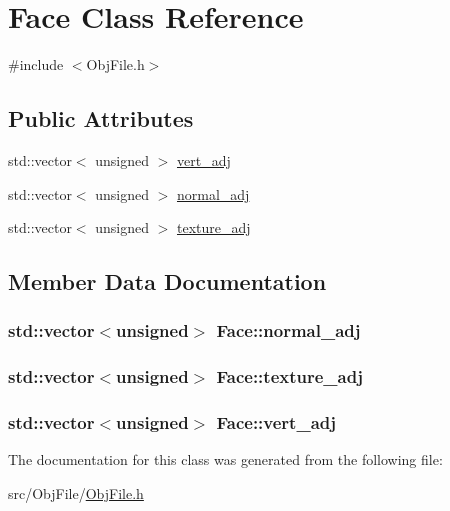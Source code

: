 \hypertarget{class_face}{}\section{Face Class Reference}
\label{class_face}


{\ttfamily \#include $<$Obj\+File.\+h$>$}

\subsection*{Public Attributes}
\begin{DoxyCompactItemize}
\item 
std\+::vector$<$ unsigned $>$ \hyperlink{class_face_ae9bd89e13d4b490419bbf1064c323160}{vert\+\_\+adj}
\item 
std\+::vector$<$ unsigned $>$ \hyperlink{class_face_a7f5e83f895d215cfd1a556fe3fcaf936}{normal\+\_\+adj}
\item 
std\+::vector$<$ unsigned $>$ \hyperlink{class_face_ad81fb1b3e97a9385aeb6e2dd360c60a7}{texture\+\_\+adj}
\end{DoxyCompactItemize}


\subsection{Member Data Documentation}
\subsubsection[{\texorpdfstring{normal\+\_\+adj}{normal_adj}}]{\setlength{\rightskip}{0pt plus 5cm}std\+::vector$<$unsigned$>$ Face\+::normal\+\_\+adj}\hypertarget{class_face_a7f5e83f895d215cfd1a556fe3fcaf936}{}\label{class_face_a7f5e83f895d215cfd1a556fe3fcaf936}
\subsubsection[{\texorpdfstring{texture\+\_\+adj}{texture_adj}}]{\setlength{\rightskip}{0pt plus 5cm}std\+::vector$<$unsigned$>$ Face\+::texture\+\_\+adj}\hypertarget{class_face_ad81fb1b3e97a9385aeb6e2dd360c60a7}{}\label{class_face_ad81fb1b3e97a9385aeb6e2dd360c60a7}
\subsubsection[{\texorpdfstring{vert\+\_\+adj}{vert_adj}}]{\setlength{\rightskip}{0pt plus 5cm}std\+::vector$<$unsigned$>$ Face\+::vert\+\_\+adj}\hypertarget{class_face_ae9bd89e13d4b490419bbf1064c323160}{}\label{class_face_ae9bd89e13d4b490419bbf1064c323160}


The documentation for this class was generated from the following file\+:\begin{DoxyCompactItemize}
\item 
src/\+Obj\+File/\hyperlink{_obj_file_8h}{Obj\+File.\+h}\end{DoxyCompactItemize}
